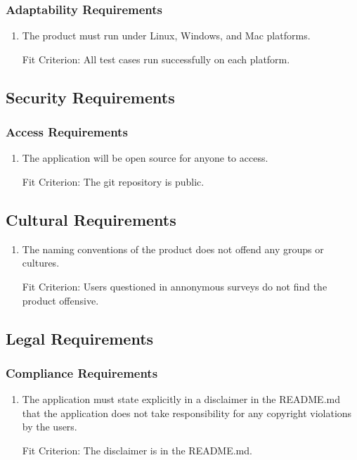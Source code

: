 \documentclass[12pt, titlepage]{article}
\begin{document}
\subsubsection{Adaptability Requirements}
\begin{enumerate}[label=ADR\arabic*:, wide=0pt, leftmargin=*]
    \item The product must run under Linux, Windows, and Mac platforms.
    \item [Fit Criterion:] All test cases run successfully on each platform.
\end{enumerate}

\subsection{Security Requirements}

\subsubsection{Access Requirements}
\begin{enumerate}[label=ACR\arabic*:, wide=0pt, leftmargin=*]
    \item The application will be open source for anyone to access.
    \item [Fit Criterion:] The git repository is public.
\end{enumerate}

\subsection{Cultural Requirements}
\begin{enumerate}[label=CR\arabic*:, wide=0pt, leftmargin=*]
    \item The naming conventions of the product does not offend any groups or cultures.
    \item [Fit Criterion:] Users questioned in annonymous surveys do not find the product offensive.
\end{enumerate}

\subsection{Legal Requirements}

\subsubsection{Compliance Requirements}
\begin{enumerate}[label=CPR\arabic*:, wide=0pt, leftmargin=*]
    \item The application must state explicitly in a disclaimer in the README.md that the application does not take responsibility for any copyright violations by the users.
    \item [Fit Criterion:] The disclaimer is in the README.md.
\end{enumerate}
\end{document}
